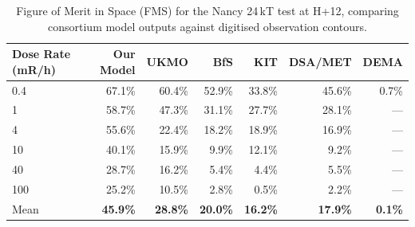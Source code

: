 \begin{table}[htbp]
\centering
\caption{Figure of Merit in Space (FMS) for the Nancy 24\,kT test at H+12, comparing consortium model outputs against digitised observation contours.}
\label{tab:nancy_fms}
\begin{tabular}{lrrrrrr}
\toprule
Dose Rate (mR/h) & Our Model & UKMO & BfS & KIT & DSA/MET & DEMA \\
\midrule
0.4 & 67.1\% & 60.4\% & 52.9\% & 33.8\% & 45.6\% & 0.7\% \\
1 & 58.7\% & 47.3\% & 31.1\% & 27.7\% & 28.1\% & --- \\
4 & 55.6\% & 22.4\% & 18.2\% & 18.9\% & 16.9\% & --- \\
10 & 40.1\% & 15.9\% & 9.9\% & 12.1\% & 9.2\% & --- \\
40 & 28.7\% & 16.2\% & 5.4\% & 4.4\% & 5.5\% & --- \\
100 & 25.2\% & 10.5\% & 2.8\% & 0.5\% & 2.2\% & --- \\
\midrule
Mean & \textbf{45.9\%} & \textbf{28.8\%} & \textbf{20.0\%} & \textbf{16.2\%} & \textbf{17.9\%} & \textbf{0.1\%} \\
\bottomrule
\end{tabular}
\end{table}
